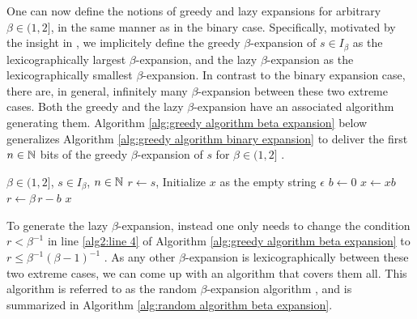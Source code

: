   One can now define the notions of greedy and lazy expansions for arbitrary $\beta \in (1,2]$, in the same manner as in the binary case. Specifically, motivated by the insight in \cite[IV-A]{daubechies2006imperfect}, we implicitely define the greedy $\beta$-expansion of $s \in I_\beta$ as the lexicographically largest $\beta$-expansion, and the lazy $\beta$-expansion as the lexicographically smallest $\beta$-expansion. In contrast to the binary expansion case, there are, in general, infinitely many $\beta$-expansion between these two extreme cases. Both the greedy and the lazy $\beta$-expansion have an associated algorithm generating them. Algorithm 
  \ref{alg:greedy algorithm beta expansion} below generalizes Algorithm \ref{alg:greedy algorithm binary expansion} to deliver the first $n \in \mathbb{N}$ bits of the greedy $\beta$-expansion of $s$ for $\beta \in (1,2]$ \cite[Section 1]{dajani2002greedy}.

  \begin{algorithm}[ht]
	\caption{Greedy algorithm for $\beta$-expansion}\label{alg:greedy algorithm beta expansion}
	\begin{algorithmic}[1]
		\Require $\beta \in (1,2]$, $s \in I_\beta$, $n\in\mathbb{N}$
		\State $r \gets s$, 
		\State Initialize $x$ as the empty string $\epsilon$
			 $b \gets 0$  \label{alg2:line 4}
			\EndIf
			\State $x \gets xb$
			\State $r \gets \beta \, r -  b$
		\EndFor
		\State \Return $x$
	\end{algorithmic}
	\end{algorithm}

	To generate the lazy $\beta$-expansion, instead one only needs to change the condition $r < \beta^{-1}$ in line \ref{alg2:line 4} of Algorithm \ref{alg:greedy algorithm beta expansion} to $r \leq \beta^{-1}(\beta - 1)^{-1}$ \cite[Section 2]{dajani2002greedy}. As any other $\beta$-expansion is lexicographically between these two extreme cases, we can come up with an algorithm that covers them all. This algorithm is referred to as the random $\beta$-expansion algorithm \cite[Section 1]{dajani2003random}, and is summarized in Algorithm \ref{alg:random algorithm beta expansion}.


